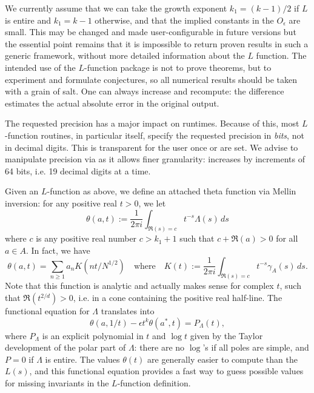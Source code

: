 We currently assume that we can take the growth exponent $k_1 = (k-1)/2$ if
$L$ is entire and $k_1 = k-1$ otherwise, and that the implied constants in
the $O_\epsilon$ are small. This may be changed and made user-configurable
in future versions but the essential point remains that it is impossible to
return proven results in such a generic framework, without more detailed
information about the $L$ function. The intended use of the $L$-function
package is not to prove theorems, but to experiment and formulate
conjectures, so all numerical results should be taken with a grain of salt.
One can always increase  and recompute: the difference
estimates the actual absolute error in the original output.

 The requested precision has a major impact on runtimes.
Because of this, most $L$-function routines, in particular  itself,
specify the requested precision in \emph{bits}, not in decimal digits.
This is transparent for the user once  or
 are set. We advise to manipulate precision via
 as it allows finer granularity: 
increases by increments of 64 bits, i.e. 19 decimal digits at a time.


Given an $L$-function as above, we define an attached theta function
via Mellin inversion: for any positive real $t > 0$, we let
$$ \theta(a,t) := \dfrac{1}{2\pi i}\int_{\Re(s) = c} t^{-s} \Lambda(s)\, ds $$
where $c$ is any positive real number $c > k_1+1$ such that $c + \Re(a) > 0$
for all $a\in A$. In fact, we have
$$\theta(a,t) = \sum_{n\geq 1} a_n K(nt/N^{1/2})
\quad\text{where}\quad
K(t) := \dfrac{1}{2\pi i}\int_{\Re(s) = c} t^{-s} \gamma_A(s)\, ds.$$
Note that this function is analytic and actually makes sense for complex $t$,
such that $\Re(t^{2/d}) > 0$, i.e. in a cone containing the positive real
half-line. The functional equation for $\Lambda$ translates into
$$ \theta(a,1/t) - \epsilon t^k\theta(a^*,t) = P_\Lambda(t), $$
where $P_\Lambda$ is an explicit polynomial in $t$ and $\log t$ given by the
Taylor development of the polar part of $\Lambda$: there are no $\log$'s if
all poles are simple, and $P = 0$ if $\Lambda$ is entire. The values
$\theta(t)$ are generally easier to compute than the $L(s)$, and this
functional equation provides a fast way to guess possible values for
missing invariants in the $L$-function definition.



